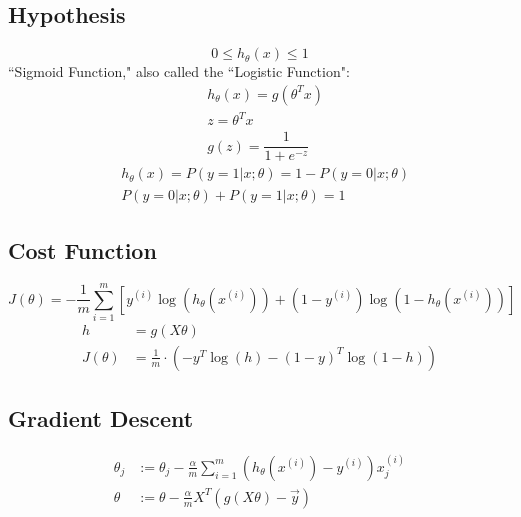 \subsection*{Hypothesis}
\begin{equation}
0 \leq h_\theta (x) \leq 1
\end{equation}
``Sigmoid Function," also called the ``Logistic Function":
\begin{align}
& h_\theta (x) =  g ( \theta^T x ) \\& z = \theta^T x \\& g(z) = \dfrac{1}{1 + e^{-z}}
\end{align}
\begin{align}
& h_\theta(x) = P(y=1 | x ; \theta) = 1 - P(y=0 | x ; \theta) \\& 
P(y = 0 | x;\theta) + P(y = 1 | x ; \theta) = 1
\end{align}
\subsection*{Cost Function}
\begin{equation}
J(\theta) = - \frac{1}{m} \displaystyle \sum_{i=1}^m [y^{(i)}\log (h_\theta (x^{(i)})) + (1 - y^{(i)})\log (1 - h_\theta(x^{(i)}))]
\end{equation}
\begin{align}
h &= g(X\theta)\\
J(\theta)  &= \frac{1}{m} \cdot \left(-y^{T}\log(h)-(1-y)^{T}\log(1-h)\right)
\end{align}
\subsection*{Gradient Descent}
\begin{align}
\theta_j &:= \theta_j - \frac{\alpha}{m} \sum_{i=1}^m (h_\theta(x^{(i)}) - y^{(i)}) x_j^{(i)} \\
\theta &:= \theta - \frac{\alpha}{m} X^{T} (g(X \theta ) - \vec{y})
\end{align}